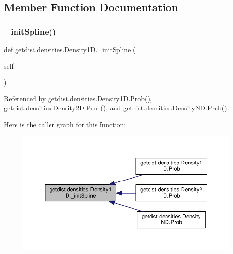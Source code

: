 \subsection{Member Function Documentation}
\mbox{\label{classgetdist_1_1densities_1_1Density1D_ac4f1619c135056810bde1b5766d1b549}} 
\subsubsection{\texorpdfstring{\+\_\+init\+Spline()}{\_initSpline()}}
{\footnotesize\ttfamily def getdist.\+densities.\+Density1\+D.\+\_\+init\+Spline (\begin{DoxyParamCaption}\item[{}]{self }\end{DoxyParamCaption})\hspace{0.3cm}{\ttfamily [private]}}



Referenced by getdist.\+densities.\+Density1\+D.\+Prob(), getdist.\+densities.\+Density2\+D.\+Prob(), and getdist.\+densities.\+Density\+N\+D.\+Prob().

Here is the caller graph for this function\+:
\nopagebreak
\begin{figure}[H]
\begin{center}
\leavevmode
\includegraphics[width=350pt]{classgetdist_1_1densities_1_1Density1D_ac4f1619c135056810bde1b5766d1b549_icgraph}
\end{center}
\end{figure}
\mbox{\label{classgetdist_1_1densities_1_1Density1D_a479ce6aff4b19e217f77ab4e161c2572}} 
